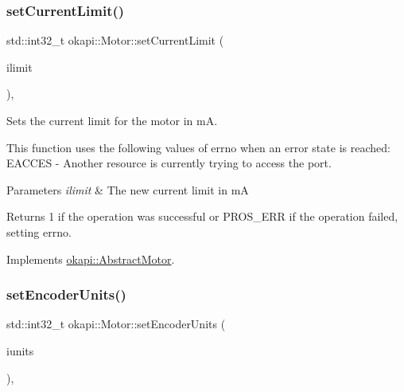 \subsubsection{\texorpdfstring{setCurrentLimit()}{setCurrentLimit()}}
{\footnotesize\ttfamily std\+::int32\+\_\+t okapi\+::\+Motor\+::set\+Current\+Limit (\begin{DoxyParamCaption}\item[{std\+::int32\+\_\+t}]{ilimit }\end{DoxyParamCaption})\hspace{0.3cm}{\ttfamily [override]}, {\ttfamily [virtual]}}

Sets the current limit for the motor in mA.

This function uses the following values of errno when an error state is reached\+: E\+A\+C\+C\+ES -\/ Another resource is currently trying to access the port.


\begin{DoxyParams}{Parameters}
{\em ilimit} & The new current limit in mA \\
\hline
\end{DoxyParams}
\begin{DoxyReturn}{Returns}
1 if the operation was successful or P\+R\+O\+S\+\_\+\+E\+RR if the operation failed, setting errno. 
\end{DoxyReturn}


Implements \mbox{\hyperlink{classokapi_1_1AbstractMotor_aec97c81f3d6604363ebc8ceaf425fe39}{okapi\+::\+Abstract\+Motor}}.

\mbox{\label{classokapi_1_1Motor_a96466636470045aa63d81cb0effc9486}} 
\subsubsection{\texorpdfstring{setEncoderUnits()}{setEncoderUnits()}}
{\footnotesize\ttfamily std\+::int32\+\_\+t okapi\+::\+Motor\+::set\+Encoder\+Units (\begin{DoxyParamCaption}\item[{\mbox{\hyperlink{classokapi_1_1AbstractMotor_ae811cd825099f2defadeb1b7f7e7764c}{Abstract\+Motor\+::encoder\+Units}}}]{iunits }\end{DoxyParamCaption})\hspace{0.3cm}{\ttfamily [override]}, {\ttfamily [virtual]}}

